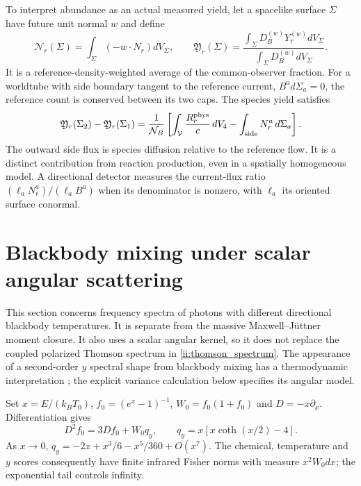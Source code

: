 To interpret abundance as an actual measured yield, let a spacelike surface $\Sigma$ have future unit normal $w$ and define
\begin{equation}
 \mathcal N_r(\Sigma)=\int_\Sigma(-w\cdot N_r)dV_\Sigma,\qquad
 \mathfrak Y_r(\Sigma)=
 \frac{\int_\Sigma D_B^{(w)}Y_r^{(w)}dV_\Sigma}
      {\int_\Sigma D_B^{(w)}dV_\Sigma}.
 \label{ii:volume_yield}
\end{equation}
It is a reference-density-weighted average of the common-observer fraction. For a worldtube with side boundary tangent to the reference current, $B^ad\Sigma_a=0$, the reference count is conserved between its two caps. The species yield satisfies
\begin{equation}
 \mathfrak Y_r(\Sigma_2)-\mathfrak Y_r(\Sigma_1)
 =\frac1{\mathcal N_B}\left[
    \int_{\mathcal V}\frac{R_r^{\rm phys}}c\,dV_4
       -\int_{\rm side}N_r^a\,d\Sigma_a\right].
 \label{ii:worldtube_balance}
\end{equation}
The outward side flux is species diffusion relative to the reference flow. It is a distinct contribution from reaction production, even in a spatially homogeneous model. A directional detector measures the current-flux ratio
$(\ell_aN_r^a)/(\ell_aB^a)$ when its denominator is nonzero, with $\ell_a$ its oriented surface conormal.


\section{Blackbody mixing under scalar angular scattering}
\label{ii:blackbody_mixing_section}
This section concerns frequency spectra of photons with different directional blackbody temperatures. It is separate from the massive Maxwell--J\"uttner moment closure. It also uses a scalar angular kernel, so it does not replace the coupled polarized Thomson spectrum in \eqref{ii:thomson_spectrum}. The appearance of a second-order $y$ spectral shape from blackbody mixing has a thermodynamic interpretation \cite{KhatriSunyaevChluba2012}; the explicit variance calculation below specifies its angular model.

Set $x=E/(k_BT_0)$, $f_0=(e^x-1)^{-1}$, $W_0=f_0(1+f_0)$ and $D=-x\partial_x$. Differentiation gives
\begin{equation}
 D^2f_0=3Df_0+W_0q_y,\qquad
 q_y=x[x\coth(x/2)-4].
 \label{ii:planck_y_identity}
\end{equation}
As $x\to0$, $q_y=-2x+x^3/6-x^5/360+O(x^7)$. The chemical, temperature and $y$ scores consequently have finite infrared Fisher norms with measure $x^2W_0dx$; the exponential tail controls infinity.

